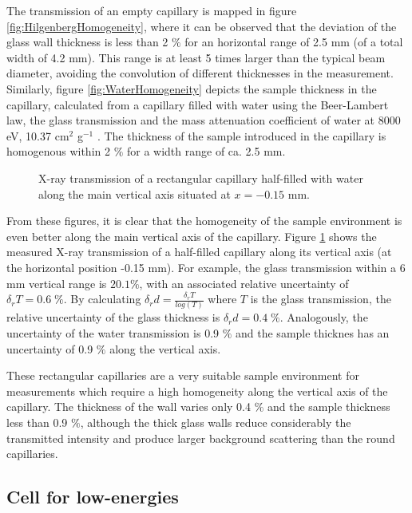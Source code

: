 The transmission of an empty capillary is mapped in figure \ref{fig:HilgenbergHomogeneity}, where it can be observed that the deviation of the glass wall thickness is less than 2 $\%$ for an horizontal range of 2.5 mm (of a total width of 4.2 mm). This range is at least 5 times larger than the typical beam diameter, avoiding the convolution of different thicknesses in the measurement. Similarly, figure \ref{fig:WaterHomogeneity} depicts the sample thickness in the capillary, calculated from a capillary filled with water using the Beer-Lambert law, the glass transmission and the mass attenuation coefficient of water at 8000 eV, 10.37 cm$^{2}$ g$^{-1}$ \citep{hubbell_tables_1996}. The thickness of the sample introduced in the capillary is homogenous within 2 $\%$ for a width range of ca. 2.5 mm. 

\begin{figure}%
	\centering
		
		\caption{X-ray transmission of a rectangular capillary half-filled with water along the main vertical axis situated at $x=-0.15$ mm.}
		\label{fig:GaldenCalibration}
\end{figure}

From these figures, it is clear that the homogeneity of the sample environment is even better along the main vertical axis of the capillary. Figure \ref{fig:GaldenCalibration} shows the measured X-ray transmission of a half-filled capillary along its vertical axis (at the horizontal position -0.15 mm). For example, the glass transmission within a 6 mm vertical range is $20.1\%$, with an associated relative uncertainty of $\delta_r T =0.6 \; \%$. By calculating $\delta_r d = \frac{\delta_r T}{log(T)}$ where $T$ is the glass transmission, the relative uncertainty of the glass thickness is $\delta_r d = 0.4 \; \%$. Analogously, the uncertainty of the water transmission is 0.9 $\%$ and the sample thicknes has an uncertainty of 0.9 $\%$ along the vertical axis.

These rectangular capillaries are a very suitable sample environment for measurements which require a high homogeneity along the vertical axis of the capillary. The thickness of the wall varies only 0.4 $\%$ and the sample thickness less than 0.9 $\%$, although the thick glass walls reduce considerably the transmitted intensity and produce larger background scattering than the round capillaries.

\subsection{Cell for low-energies}

